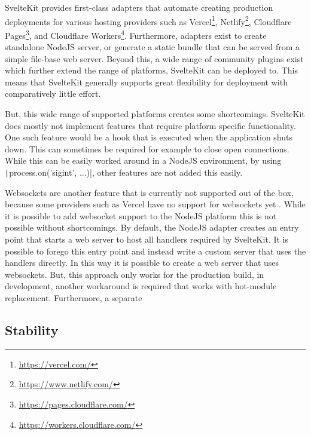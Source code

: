 SvelteKit provides first-class adapters that automate creating production deployments for various hosting providers such as Vercel\footnote{\url{https://vercel.com/}}, Netlify\footnote{\url{https://www.netlify.com/}}, Cloudflare Pages\footnote{\url{https://pages.cloudflare.com/}}, and Cloudflare Workers\footnote{\url{https://workers.cloudflare.com/}}. Furthermore, adapters exist to create standalone NodeJS server, or generate a static bundle that can be served from a simple file-base web server. Beyond this, a wide range of community plugins exist which further extend the range of platforms, SvelteKit can be deployed to. This means that SvelteKit generally supports great flexibility for deployment with comparatively little effort.  

But, this wide range of supported platforms creates some shortcomings. SvelteKit does mostly not implement features that require platform specific functionality. One such feature would be a hook that is executed when the application shuts down. This can sometimes be required for example to close open connections. While this can be easily worked around in a NodeJS environment, by using \texttt|process.on('sigint', ...)|, other features are not added this easily. 

Websockets are another feature that is currently not supported out of the box, because some providers such as Vercel have no support for websockets yet \cite{noauthor_vercel_nodate}. While it is possible to add websocket support to the NodeJS platform this is not possible without shortcomings. By default, the NodeJS adapter creates an entry point that starts a web server to host all handlers required by SvelteKit. It is possible to forego this entry point and instead write a custom server that uses the handlers directly. In this way it is possible to create a web server that uses websockets. But, this approach only works for the production build, in development, another workaround is required that works with hot-module replacement. Furthermore, a separate 


\subsection{Stability}


